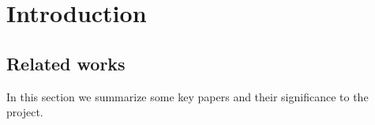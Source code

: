 \chapter{Introduction}

\section{Related works}
In this section we summarize some key papers and their significance to the
project.
